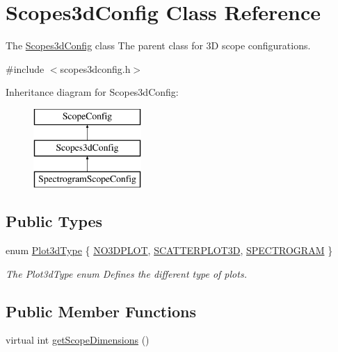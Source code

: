 \hypertarget{class_scopes3d_config}{\section{\-Scopes3d\-Config \-Class \-Reference}
\label{class_scopes3d_config}
}


\-The \hyperlink{class_scopes3d_config}{\-Scopes3d\-Config} class \-The parent class for 3\-D scope configurations.  




{\ttfamily \#include $<$scopes3dconfig.\-h$>$}

\-Inheritance diagram for \-Scopes3d\-Config\-:\begin{figure}[H]
\begin{center}
\leavevmode
\includegraphics[height=3.000000cm]{class_scopes3d_config}
\end{center}
\end{figure}
\subsection*{\-Public \-Types}
\begin{DoxyCompactItemize}
\item 
enum \hyperlink{group___scope_plugin_ga50e7b7155f87047a171af78191828496}{\-Plot3d\-Type} \{ \hyperlink{group___scope_plugin_gga50e7b7155f87047a171af78191828496ae3b1069e4985d5e50337e7bd39969e74}{\-N\-O3\-D\-P\-L\-O\-T}, 
\hyperlink{group___scope_plugin_gga50e7b7155f87047a171af78191828496a48fce9291e9e40ea180ad0d14f5bce39}{\-S\-C\-A\-T\-T\-E\-R\-P\-L\-O\-T3\-D}, 
\hyperlink{group___scope_plugin_gga50e7b7155f87047a171af78191828496a84544a635d05fc1c4c6a7a273653d59e}{\-S\-P\-E\-C\-T\-R\-O\-G\-R\-A\-M}
 \}
\begin{DoxyCompactList}\small\item\em \-The \-Plot3d\-Type enum \-Defines the different type of plots. \end{DoxyCompactList}\end{DoxyCompactItemize}
\subsection*{\-Public \-Member \-Functions}
\begin{DoxyCompactItemize}
\item 
virtual int \hyperlink{group___scope_plugin_ga19f02e368a922611f86005f7e18f12bf}{get\-Scope\-Dimensions} ()
\end{DoxyCompactItemize}


